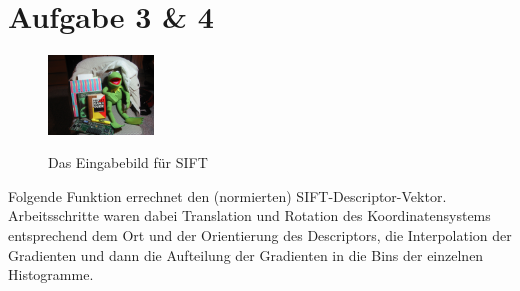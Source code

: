 




\newcommand{\nr}{2}


\section*{Aufgabe 3 \& 4}

\begin{figure}[htpb]
\begin{center}
{\includegraphics[width=0.25\textwidth]{samples/kermit001}}
\end{center}
\caption{Das Eingabebild für SIFT }
\label{fig:u02-picture}
\end{figure}

Folgende Funktion errechnet den (normierten) SIFT-Descriptor-Vektor.
Arbeitsschritte waren dabei Translation und Rotation des Koordinatensystems entsprechend dem Ort und der Orientierung des Descriptors, die Interpolation der Gradienten und dann die Aufteilung der Gradienten in die Bins der einzelnen Histogramme.

